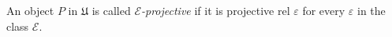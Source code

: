 An object $P$ in $\mathfrak{U}$ is called \textit{$\mathcal{E}$-projective} if it is projective rel $\varepsilon$ for every $\varepsilon$ in the class $\mathcal{E}$.